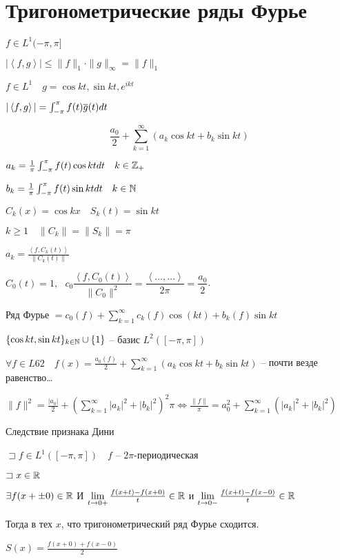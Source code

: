 \section{Тригонометрические ряды Фурье}

$f \in L^1(-\pi, \pi]$

$|\left<f, g \right>| \leqslant \|f\|_1 \cdot \|g\|_{\infty } = \|f\|_1$

$f\in L^1\quad g = \cos kt, \sin kt, e^{ikt}$

$|\left<f, g \right>| = \int_{-\pi}^{\pi} f(t)\overline{g}(t)dt$

\begin{definition}
    \[\frac{a_0}{2} + \sum_{k=1}^{\infty } \left( a_k\cos kt + b_k\sin kt \right)  \]

    $a_k = \frac{1}{\pi}\int_{-\pi}^{\pi}f(t)\cos kt dt\quad k\in \mathbb{Z}_+$

    $b_k = \frac{1}{\pi} \int_{-\pi}^{\pi}f(t)\sin kt dt\quad k\in \mathbb{N} $

    $C_k(x) = \cos k x\quad S_k(t) = \sin kt$

    $k \geqslant 1\quad \|C_k\| = \|S_k\| = \pi$

    $a_k = \frac{\left<f, C_k(t) \right>}{\|C_k(t)\|}$

    $C_0 (t) = 1, ~~~c_0 \dfrac{\left< f, C_0(t) \right> }{\| C_0\|^2} = \dfrac{\left< \dots, \dots \right>}{2\pi} = \dfrac{a_0}{2}$.

    Ряд Фурье $ = c_0(f) + \sum_{k=1}^{\infty } c_k(f)\cos(kt) + b_k(f)\sin k t $
\end{definition}

\begin{note}
    [Факт]

    $\{\cos kt, \sin kt\}_{k\in \mathbb{N} } \cup \{1\}$ -- базис $L^2\left( [-\pi, \pi] \right) $

    $\forall f\in L62\quad f(x) = \frac{a_0(f)}{2} + \sum_{k=1}^{\infty } \left( a_k \cos kt + b_k\sin kt \right) $ -- почти везде равенство\ldots

    $\|f\|^2 = \frac{|a_0|}{2} + \left(\sum_{k=1}^{\infty } |a_k|^2 + |b_k|^2\right)^2 \pi \iff \frac{\|f\|}{\pi} = a_0^2 + \sum_{k=1}^{\infty }\left( |a_k|^2 + |b_k|^2 \right)  $
\end{note}

\begin{note}
    [Факт 2] Следствие признака Дини

    $\sqsupset  f\in L^1([-\pi, \pi])\quad f$ -- $2\pi$-периодическая

    $\sqsupset x\in \mathbb{R}$

    $\exists f(x+\pm 0)\in \mathbb{R}$ И $\lim_{t \to 0+} \frac{f(x+t) - f(x+0)}{t} \in \R $ и $\lim_{t \to 0-} \frac{f(x+t)- f(x-0)}{t}\in \R$

    Тогда в тех $x$, что тригонометрический ряд Фурье сходится.

    $S(x) = \frac{f(x+0) + f(x-0)}{2}$
\end{note}

